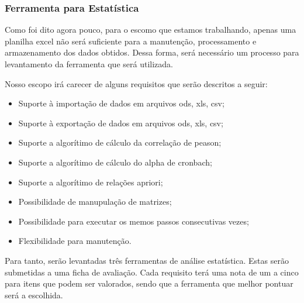 \subsubsection{Ferramenta para Estatística}
\label{sub:ferramenta_para_estat_stica}
Como foi dito agora pouco, para o escomo que estamos trabalhando, apenas uma planilha excel não será suficiente
para a manutenção, processamento e armazenamento dos dados obtidos. Dessa forma, será  necessário um processo
para levantamento da ferramenta que será utilizada.

Nosso escopo irá carecer de alguns requisitos que serão descritos a seguir:

\begin{itemize}
    \item Suporte à importação de dados em arquivos ods, xls, csv;
    \item Suporte à exportação de dados em arquivos ods, xls, csv;
    \item Suporte a algorítimo de cálculo da correlação de peason;
    \item Suporte a algorítimo de cálculo do alpha de cronbach;
    \item Suporte a algorítimo de relações apriori;
    \item Possibilidade de manupulação de matrizes;
    \item Possibilidade para executar os memos passos consecutivas vezes;
    \item Flexibilidade para manutenção.
\end{itemize}

Para tanto, serão levantadas três ferramentas de análise estatística. Estas serão submetidas a uma ficha de avaliação.
Cada requisito terá uma nota de um a cinco para itens que podem ser valorados, sendo que a ferramenta que melhor pontuar será a escolhida.

